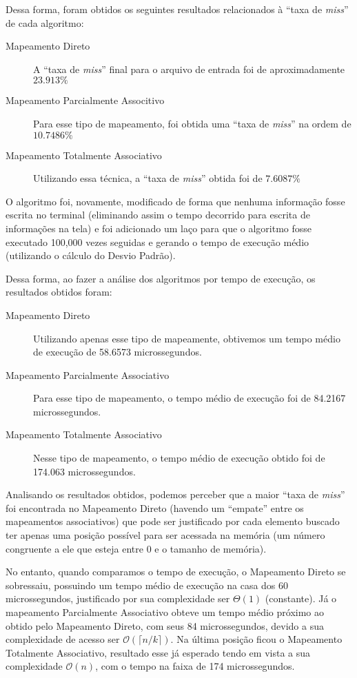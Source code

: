 \documentclass[12pt,openright,oneside,a4paper,english,brazil]{abntex2}
\begin{document}
Dessa forma, foram obtidos os seguintes resultados relacionados à ``taxa de \textit{miss}'' de cada algoritmo:

\begin{description}
\item[Mapeamento Direto]
A ``taxa de \textit{miss}'' final para o arquivo de entrada foi de aproximadamente $ 23.913\% $
\item[Mapeamento Parcialmente Associtivo]
Para esse tipo de mapeamento, foi obtida uma ``taxa de \textit{miss}'' na ordem de $ 10.7486\% $
\item[Mapeamento Totalmente Associativo]
Utilizando essa técnica, a ``taxa de \textit{miss}'' obtida foi de $ 7.6087\% $
\end{description}

O algoritmo foi, novamente, modificado de forma que nenhuma informação fosse escrita no terminal (eliminando assim o tempo decorrido para escrita de informações na tela) e foi adicionado um laço para que o algoritmo fosse executado 100,000 vezes seguidas e gerando o tempo de execução médio (utilizando o cálculo do Desvio Padrão).

Dessa forma, ao fazer a análise dos algoritmos por tempo de execução, os resultados obtidos foram:

\begin{description}
\item[Mapeamento Direto]
Utilizando apenas esse tipo de mapeamente, obtivemos um tempo médio de execução de 58.6573 microssegundos.
\item[Mapeamento Parcialmente Associativo]
Para esse tipo de mapeamento, o tempo médio de execução foi de 84.2167 microssegundos.
\item[Mapeamento Totalmente Associativo]
Nesse tipo de mapeamento, o tempo médio de execução obtido foi de 174.063 microssegundos.
\end{description}

Analisando os resultados obtidos, podemos perceber que a maior ``taxa de \textit{miss}'' foi encontrada no Mapeamento Direto (havendo um ``empate'' entre os mapeamentos associativos) que pode ser justificado por cada elemento buscado ter apenas uma posição possível para ser acessada na memória (um número congruente a ele que esteja entre 0 e o tamanho de memória).

No entanto, quando comparamos o tempo de execução, o Mapeamento Direto se sobressaiu, possuindo um tempo médio de execução na casa dos 60 microssegundos, justificado por sua complexidade ser $ \Theta (1) $ (constante). Já o mapeamento Parcialmente Associativo obteve um tempo médio próximo ao obtido pelo Mapeamento Direto, com seus 84 microssegundos, devido a sua complexidade de acesso ser $ \mathcal{O} (\lceil n/k \rceil) $.
Na última posição ficou o Mapeamento Totalmente Associativo, resultado esse já esperado tendo em vista a sua complexidade $ \mathcal{O} (n) $, com o tempo na faixa de 174 microssegundos.
\end{document}
